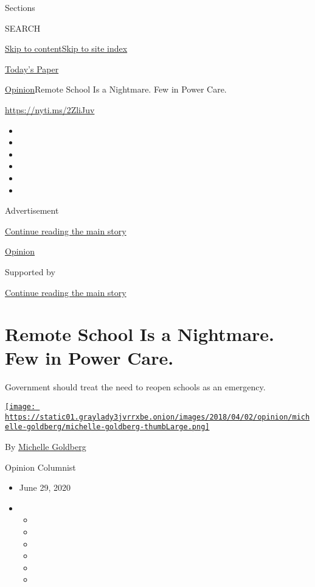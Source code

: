 Sections

SEARCH

\protect\hyperlink{site-content}{Skip to
content}\protect\hyperlink{site-index}{Skip to site index}

\href{https://myaccount.nytimes3xbfgragh.onion/auth/login?response_type=cookie\&client_id=vi}{}

\href{https://www.nytimes3xbfgragh.onion/section/todayspaper}{Today's
Paper}

\href{/section/opinion}{Opinion}\textbar{}Remote School Is a Nightmare.
Few in Power Care.

\url{https://nyti.ms/2ZliJuv}

\begin{itemize}
\item
\item
\item
\item
\item
\item
\end{itemize}

Advertisement

\protect\hyperlink{after-top}{Continue reading the main story}

\href{/section/opinion}{Opinion}

Supported by

\protect\hyperlink{after-sponsor}{Continue reading the main story}

\hypertarget{remote-school-is-a-nightmare-few-in-power-care}{%
\section{Remote School Is a Nightmare. Few in Power
Care.}\label{remote-school-is-a-nightmare-few-in-power-care}}

Government should treat the need to reopen schools as an emergency.

\href{https://www.nytimes3xbfgragh.onion/by/michelle-goldberg}{\texttt{[image: https://static01.graylady3jvrrxbe.onion/images/2018/04/02/opinion/michelle-goldberg/michelle-goldberg-thumbLarge.png]}}

By
\href{https://www.nytimes3xbfgragh.onion/by/michelle-goldberg}{Michelle
Goldberg}

Opinion Columnist

\begin{itemize}
\item
  June 29, 2020
\item
  \begin{itemize}
  \item
  \item
  \item
  \item
  \item
  \item
  \end{itemize}
\end{itemize}

